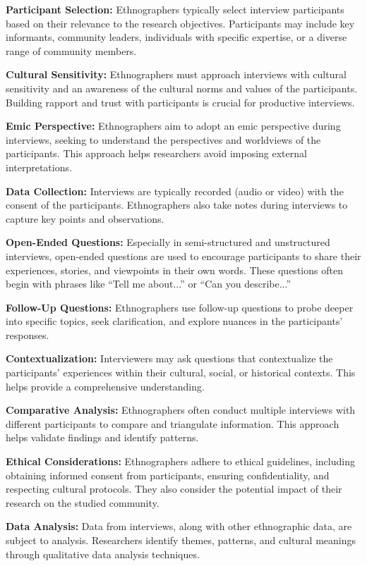 \documentclass[
  b5paper]{book}
\begin{document}
\textbf{Participant Selection:} Ethnographers typically select interview participants based on their relevance to the research objectives. Participants may include key informants, community leaders, individuals with specific expertise, or a diverse range of community members.

\textbf{Cultural Sensitivity:} Ethnographers must approach interviews with cultural sensitivity and an awareness of the cultural norms and values of the participants. Building rapport and trust with participants is crucial for productive interviews.

\textbf{Emic Perspective:} Ethnographers aim to adopt an emic perspective during interviews, seeking to understand the perspectives and worldviews of the participants. This approach helps researchers avoid imposing external interpretations.

\textbf{Data Collection:} Interviews are typically recorded (audio or video) with the consent of the participants. Ethnographers also take notes during interviews to capture key points and observations.

\textbf{Open-Ended Questions:} Especially in semi-structured and unstructured interviews, open-ended questions are used to encourage participants to share their experiences, stories, and viewpoints in their own words. These questions often begin with phrases like ``Tell me about...'' or ``Can you describe...''

\textbf{Follow-Up Questions:} Ethnographers use follow-up questions to probe deeper into specific topics, seek clarification, and explore nuances in the participants' responses.

\textbf{Contextualization:} Interviewers may ask questions that contextualize the participants' experiences within their cultural, social, or historical contexts. This helps provide a comprehensive understanding.

\textbf{Comparative Analysis:} Ethnographers often conduct multiple interviews with different participants to compare and triangulate information. This approach helps validate findings and identify patterns.

\textbf{Ethical Considerations:} Ethnographers adhere to ethical guidelines, including obtaining informed consent from participants, ensuring confidentiality, and respecting cultural protocols. They also consider the potential impact of their research on the studied community.

\textbf{Data Analysis:} Data from interviews, along with other ethnographic data, are subject to analysis. Researchers identify themes, patterns, and cultural meanings through qualitative data analysis techniques.
\end{document}
